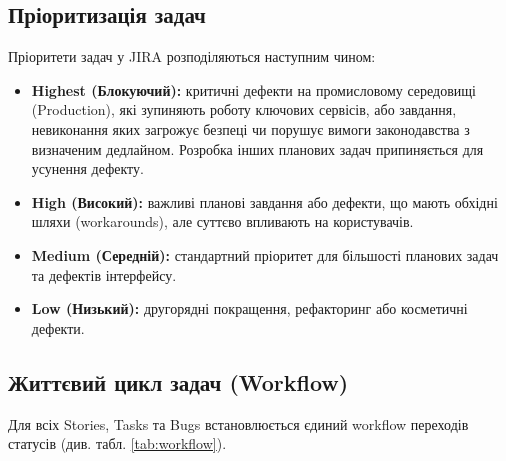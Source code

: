 \documentclass{article}
\begin{document}
\subsection{Пріоритизація задач}
Пріоритети задач у JIRA розподіляються наступним чином:
\begin{itemize}
    \item \textbf{Highest (Блокуючий):} критичні дефекти на промисловому середовищі (Production), які зупиняють роботу ключових сервісів, або завдання, невиконання яких загрожує безпеці чи порушує вимоги законодавства з визначеним дедлайном. Розробка інших планових задач припиняється для усунення дефекту.
    \item \textbf{High (Високий):} важливі планові завдання або дефекти, що мають обхідні шляхи (workarounds), але суттєво впливають на користувачів.
    \item \textbf{Medium (Середній):} стандартний пріоритет для більшості планових задач та дефектів інтерфейсу.
    \item \textbf{Low (Низький):} другорядні покращення, рефакторинг або косметичні дефекти.
\end{itemize}

\subsection{Життєвий цикл задач (Workflow)}
Для всіх Stories, Tasks та Bugs встановлюється єдиний workflow переходів статусів (див. табл. \ref{tab:workflow}).
\end{document}
